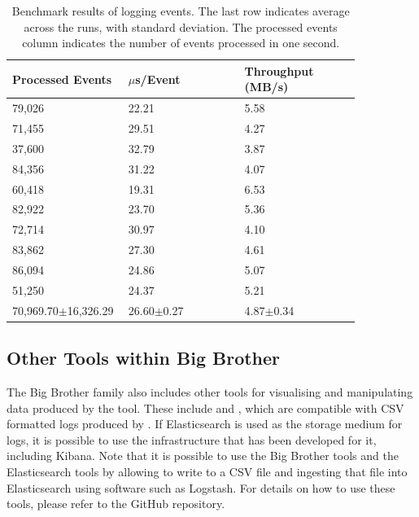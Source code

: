 \begin{table}
\centering
\begin{tabular}{p{0.28\linewidth}p{0.28\linewidth}p{0.29\linewidth}}
	\hline
	Processed Events    & $\mu$s/Event   & Throughput (MB/s) \\ \hline
	79,026     & 22.21          & 5.58              \\
	71,455     & 29.51          & 4.27              \\
	37,600     & 32.79          & 3.87              \\
	84,356     & 31.22          & 4.07              \\
	60,418     & 19.31          & 6.53              \\
	82,922     & 23.70          & 5.36              \\
	72,714     & 30.97          & 4.10              \\
	83,862     & 27.30          & 4.61              \\
	86,094     & 24.86          & 5.07              \\
	51,250     & 24.37          & 5.21              \\ \hline\hline
	70,969.70$\pm$16,326.29 & 26.60$\pm$0.27 & 4.87$\pm$0.34     \\ \hline
\end{tabular}
\caption{Benchmark results of logging events. The last row indicates average across the runs, with standard deviation. The processed events column indicates the number of events processed in one second.\vspace{-24pt}}
\label{tbl:bench}
\end{table}



\subsection{Other Tools within Big Brother}

The Big Brother family also includes other tools for visualising and manipulating data produced by the \bb tool. These include \bbheat and \bbstat, which are compatible with CSV formatted logs produced by \bb. If Elasticsearch is used as the storage medium for logs, it is possible to use the infrastructure that has been developed for it, including Kibana. Note that it is possible to use the Big Brother tools and the Elasticsearch tools by allowing \bb to write to a CSV file and ingesting that file into Elasticsearch using software such as Logstash. For details on how to use these tools, please refer to the GitHub repository.

